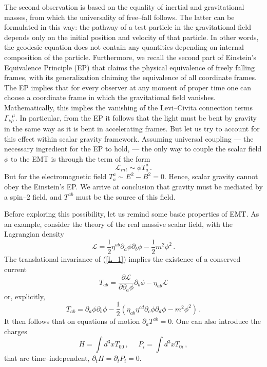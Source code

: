 \documentclass[12pt]{article}
\begin{document}
The second observation is based on the equality of inertial and gravitational masses, from which the universality of free--fall follows.
The latter can be formulated in this way: the pathway of a test particle in the gravitational field depends only on the initial position and velocity of that particle. In other words, the geodesic equation does not contain any quantities depending on internal composition of the particle. Furthermore, we recall the second part of Einstein's Equivalence Principle (EP) that claims the physical equivalence of freely falling frames, with its generalization claiming the equivalence of all coordinate frames. The EP implies that for every observer at any moment of proper time one can choose a coordinate frame in which the gravitational field vanishes. Mathematically, this implies the vanishing of the Levi--Civita connection terms $\Gamma^{~~~\mu}_{\nu\rho}$.
In particular, from the EP it follows that the light must be bent by gravity in the same way as it is bent in accelerating frames. But let us try to account for this effect within scalar gravity framework. Assuming universal coupling --- the necessary ingredient for the EP to hold, --- the only way to couple the scalar field $\phi$ to the EMT is through the term of the form
\begin{equation}
\mathcal{L}_{int}\sim \phi T^a_a  \,.
\end{equation}
But for the electromagnetic field $T^a_a \sim E^2-B^2=0$. Hence, scalar gravity cannot obey the Einstein's EP. We arrive at conclusion that gravity must be mediated by a spin--$2$ field, and $T^{ab}$ must be the source of this field.

Before exploring this possibility, let us remind some basic properties of EMT. As an example, consider the theory of the real massive scalar field, with the Lagrangian density
\begin{equation}\label{L_1}
\mathcal{L}=\dfrac{1}{2}\eta^{ab}\partial_a\phi\partial_b\phi-\dfrac{1}{2}m^2\phi^2  \,.
\end{equation}
The translational invariance of (\ref{L_1}) implies the existence of a conserved current
\begin{equation}
T_{ab}=\dfrac{\partial\mathcal{L}}{\partial\partial_a\phi}\partial_b\phi-\eta_{ab}\mathcal{L}
\end{equation}
or, explicitly,
\begin{equation}\label{ScalarFieldEMT}
T_{ab}=\partial_a\phi\partial_b\phi-\dfrac{1}{2}\left(\eta_{ab}\eta^{cd}\partial_c\phi\partial_d\phi-m^2\phi^2\right)   \,.
\end{equation}
It then follows that on equations of motion $\partial_a T^{ab}=0$. One can also introduce the charges
\begin{equation}
H=\int d^3x T_{00}  \,,~~~~~~P_i=\int d^3x T_{0i} \,,
\end{equation}
that are time--independent, $\partial_tH=\partial_tP_i=0$.
\end{document}
